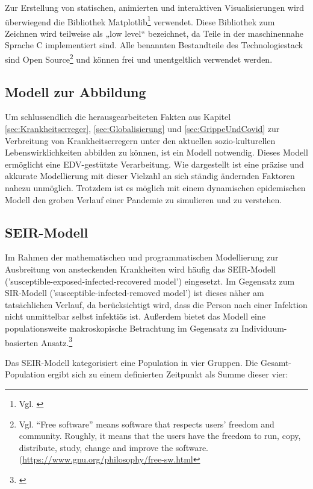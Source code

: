 \documentclass[12pt]{article}
\begin{document}
Zur Erstellung von statischen, animierten und interaktiven Visualisierungen wird überwiegend die Bibliothek Matplotlib\footnote{Vgl. \cite{matplotlib}} verwendet. Diese Bibliothek zum Zeichnen wird teilweise als „low level“ bezeichnet, da Teile in der maschinennahe Sprache C implementiert sind. Alle benannten Bestandteile des Technologiestack sind Open Source\footnote{Vgl. “Free software” means software that respects users' freedom and community. Roughly, it means that the users have the freedom to run, copy, distribute, study, change and improve the software. (\url{https://www.gnu.org/philosophy/free-sw.html}} und können frei und unentgeltlich verwendet werden.

\subsection{Modell zur Abbildung}
Um schlussendlich die herausgearbeiteten Fakten aus Kapitel \ref{sec:Krankheitserreger}, \ref{sec:Globalisierung} und \ref{sec:GrippeUndCovid} zur Verbreitung von Krankheitserregern unter den aktuellen sozio-kulturellen Lebenswirklichkeiten abbilden zu können, ist ein Modell notwendig. Dieses Modell ermöglicht eine EDV-gestützte Verarbeitung. Wie dargestellt ist eine präzise und akkurate Modellierung mit dieser Vielzahl an sich ständig ändernden Faktoren nahezu unmöglich. Trotzdem ist es möglich mit einem dynamischen epidemischen Modell den groben Verlauf einer Pandemie zu simulieren und zu verstehen.

\subsection{SEIR-Modell}
Im Rahmen der mathematischen und programmatischen Modellierung zur Ausbreitung von ansteckenden Krankheiten wird häufig das SEIR-Modell ('susceptible-exposed-infected-recovered model') eingesetzt. Im Gegensatz zum SIR-Modell ('susceptible-infected-removed model') ist dieses näher am tatsächlichen Verlauf, da berücksichtigt wird, dass die Person nach einer Infektion nicht unmittelbar selbst infektiös ist. Außerdem bietet das Modell eine populationsweite makroskopische Betrachtung im Gegensatz zu Individuum-basierten Ansatz.\footnote{\cite{SEIR}}

Das SEIR-Modell kategorisiert eine Population in vier Gruppen. Die Gesamt-Population ergibt sich zu einem definierten Zeitpunkt als Summe dieser vier:
\end{document}
